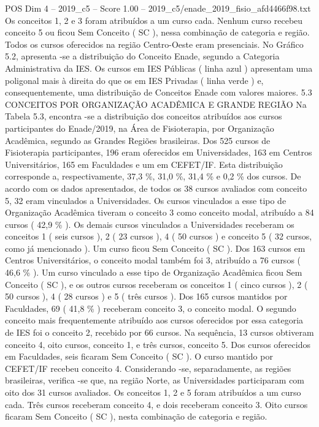 \begin{textsample}{POS Dim 4 – 2019\_c5 – Score 1.00 – 2019\_c5/enade\_2019\_fisio\_afd4466f98.txt}
Os conceitos 1, 2 e 3 foram atribuídos a um curso cada.
Nenhum curso recebeu conceito 5 ou ficou Sem Conceito ( SC ), nessa combinação de categoria e região.
Todos os cursos oferecidos na região Centro-Oeste eram presenciais.
No Gráfico 5.2, apresenta -se a distribuição do Conceito Enade, segundo a Categoria Administrativa da IES.
Os cursos em IES Públicas ( linha azul ) apresentam uma poligonal mais à direita do que os em IES Privadas ( linha verde ) e, consequentemente, uma distribuição de Conceitos Enade com valores maiores. 5.3 CONCEITOS POR ORGANIZAÇÃO ACADÊMICA E GRANDE REGIÃO Na Tabela 5.3, encontra -se a distribuição dos conceitos atribuídos aos cursos participantes do Enade/2019, na Área de Fisioterapia, por Organização Acadêmica, segundo as Grandes Regiões brasileiras.
Dos 525 cursos de Fisioterapia participantes, 196 eram oferecidos em Universidades, 163 em Centros Universitários, 165 em Faculdades e um em CEFET/IF.
Esta distribuição corresponde a, respectivamente, 37,3 \%, 31,0 \%, 31,4 \% e 0,2 \% dos cursos.
De acordo com os dados apresentados, de todos os 38 cursos avaliados com conceito 5, 32 eram vinculados a Universidades.
Os cursos vinculados a esse tipo de Organização Acadêmica tiveram o conceito 3 como conceito modal, atribuído a 84 cursos ( 42,9 \% ).
Os demais cursos vinculados a Universidades receberam os conceitos 1 ( seis cursos ), 2 ( 23 cursos ), 4 ( 50 cursos ) e conceito 5 ( 32 cursos, como já mencionado ).
Um curso ficou Sem Conceito ( SC ).
Dos 163 cursos em Centros Universitários, o conceito modal também foi 3, atribuído a 76 cursos ( 46,6 \% ).
Um curso vinculado a esse tipo de Organização Acadêmica ficou Sem Conceito ( SC ), e os outros cursos receberam os conceitos 1 ( cinco cursos ), 2 ( 50 cursos ), 4 ( 28 cursos ) e 5 ( três cursos ).
Dos 165 cursos mantidos por Faculdades, 69 ( 41,8 \% ) receberam conceito 3, o conceito modal.
O segundo conceito mais frequentemente atribuído aos cursos oferecidos por essa categoria de IES foi o conceito 2, recebido por 66 cursos.
Na sequência, 13 cursos obtiveram conceito 4, oito cursos, conceito 1, e três cursos, conceito 5.
Dos cursos oferecidos em Faculdades, seis ficaram Sem Conceito ( SC ).
O curso mantido por CEFET/IF recebeu conceito 4.
Considerando -se, separadamente, as regiões brasileiras, verifica -se que, na região Norte, as Universidades participaram com oito dos 31 cursos avaliados.
Os conceitos 1, 2 e 5 foram atribuídos a um curso cada.
Três cursos receberam conceito 4, e dois receberam conceito 3.
Oito cursos ficaram Sem Conceito ( SC ), nesta combinação de categoria e região.

\end{textsample}
